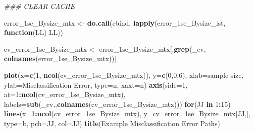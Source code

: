 \documentclass[
]{book}
\newenvironment{Shaded}{\begin{snugshade}}{\end{snugshade}}
\newcommand{\CommentTok}[1]{\textcolor[rgb]{0.56,0.35,0.01}{\textit{#1}}}
\newcommand{\ControlFlowTok}[1]{\textcolor[rgb]{0.13,0.29,0.53}{\textbf{#1}}}
\newcommand{\DataTypeTok}[1]{\textcolor[rgb]{0.13,0.29,0.53}{#1}}
\newcommand{\DecValTok}[1]{\textcolor[rgb]{0.00,0.00,0.81}{#1}}
\newcommand{\FloatTok}[1]{\textcolor[rgb]{0.00,0.00,0.81}{#1}}
\newcommand{\KeywordTok}[1]{\textcolor[rgb]{0.13,0.29,0.53}{\textbf{#1}}}
\newcommand{\NormalTok}[1]{#1}
\newcommand{\OperatorTok}[1]{\textcolor[rgb]{0.81,0.36,0.00}{\textbf{#1}}}
\newcommand{\StringTok}[1]{\textcolor[rgb]{0.31,0.60,0.02}{#1}}
\begin{document}
\begin{Shaded}
\begin{Highlighting}[]
\CommentTok{\#\#\# CLEAR CACHE}

\NormalTok{error\_1se\_Bysize\_mtx <{-}}\StringTok{ }\KeywordTok{do.call}\NormalTok{(}\StringTok{\textquotesingle{}cbind\textquotesingle{}}\NormalTok{, }\KeywordTok{lapply}\NormalTok{(error\_1se\_Bysize\_lst, }\ControlFlowTok{function}\NormalTok{(LL) LL))}

\NormalTok{cv\_error\_1se\_Bysize\_mtx <{-}}\StringTok{ }\NormalTok{error\_1se\_Bysize\_mtx[,}\KeywordTok{grep}\NormalTok{(}\StringTok{\textquotesingle{}\_cv\textquotesingle{}}\NormalTok{, }\KeywordTok{colnames}\NormalTok{(error\_1se\_Bysize\_mtx))]}

\KeywordTok{plot}\NormalTok{(}\DataTypeTok{x=}\KeywordTok{c}\NormalTok{(}\DecValTok{1}\NormalTok{, }\KeywordTok{ncol}\NormalTok{(cv\_error\_1se\_Bysize\_mtx)), }\DataTypeTok{y=}\KeywordTok{c}\NormalTok{(}\DecValTok{0}\NormalTok{,}\FloatTok{0.6}\NormalTok{), }
  \DataTypeTok{xlab=}\StringTok{\textquotesingle{}sample size\textquotesingle{}}\NormalTok{, }\DataTypeTok{ylab=}\StringTok{\textquotesingle{}Misclassification Error\textquotesingle{}}\NormalTok{, }
  \DataTypeTok{type=}\StringTok{\textquotesingle{}n\textquotesingle{}}\NormalTok{, }\DataTypeTok{xaxt=}\StringTok{\textquotesingle{}n\textquotesingle{}}\NormalTok{)}
\KeywordTok{axis}\NormalTok{(}\DataTypeTok{side=}\DecValTok{1}\NormalTok{, }\DataTypeTok{at=}\DecValTok{1}\OperatorTok{:}\KeywordTok{ncol}\NormalTok{(cv\_error\_1se\_Bysize\_mtx),}
 \DataTypeTok{labels=}\KeywordTok{sub}\NormalTok{(}\StringTok{\textquotesingle{}\_cv\textquotesingle{}}\NormalTok{,}\StringTok{\textquotesingle{}\textquotesingle{}}\NormalTok{,}\KeywordTok{colnames}\NormalTok{(cv\_error\_1se\_Bysize\_mtx)))}
\ControlFlowTok{for}\NormalTok{(JJ }\ControlFlowTok{in} \DecValTok{1}\OperatorTok{:}\DecValTok{15}\NormalTok{)}
\KeywordTok{lines}\NormalTok{(}\DataTypeTok{x=}\DecValTok{1}\OperatorTok{:}\KeywordTok{ncol}\NormalTok{(cv\_error\_1se\_Bysize\_mtx), }\DataTypeTok{y=}\NormalTok{cv\_error\_1se\_Bysize\_mtx[JJ,],}
 \DataTypeTok{type=}\StringTok{\textquotesingle{}b\textquotesingle{}}\NormalTok{, }\DataTypeTok{pch=}\NormalTok{JJ, }\DataTypeTok{col=}\NormalTok{JJ)}
\KeywordTok{title}\NormalTok{(}\StringTok{\textquotesingle{}Example Misclassification Error Paths\textquotesingle{}}\NormalTok{)}
\end{Highlighting}
\end{Shaded}
\end{document}
